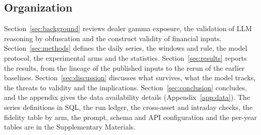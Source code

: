 \subsection{Organization}
\label{sec:introduction:organization}

Section~\ref{sec:background} reviews dealer gamma exposure, the validation of LLM reasoning by obfuscation and the construct validity of financial inputs. Section~\ref{sec:methods} defines the daily series, the windows and rule, the model protocol, the experimental arms and the statistics. Section~\ref{sec:results} reports the results, from the lineage of the published inputs to the rerun of the earlier baselines. Section~\ref{sec:discussion} discusses what survives, what the model tracks, the threats to validity and the implications. Section~\ref{sec:conclusion} concludes, and the appendix gives the data availability details (Appendix~\ref{app:data}). The series definitions in SQL, the run ledger, the cross-asset and intraday checks, the fidelity table by arm, the prompt, schema and API configuration and the per-year tables are in the Supplementary Materials.
